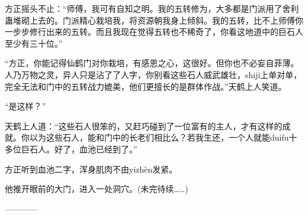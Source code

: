 \begin{this_body}
方正摇头不止：“师傅，我可有自知之明。我的五转修为，大多都是门派用了舍利蛊堆砌上去的。门派精心栽培我，将资源朝我身上倾斜。我的五转，比不上师傅你一步步修行出来的五转。而且我现在觉得五转也不稀奇了，你看这地道中的巨石人至少有三十位。”

“方正，你能记得仙鹤门对你栽培，有感恩之心，这很好。但你也不必妄自菲薄。人乃万物之灵，异人只是沾了了人字，你别看这些石人威武雄壮，shiji上单对单，完全无法和门中的五转战力媲美，他们更擅长的是群体作战。”天鹤上人笑道。

“是这样？”

天鹤上人道：“这些石人很笨的，又赶巧碰到了一位富有的主人，才有这样的成就。你以为这些石人，能和门中的长老们相比么？若我生还，一个人就能duifu十多位巨石人。好了，血池已经到了。”

方正听到血池二字，浑身肌肉不由yizhèn发紧。

他推开眼前的大门，进入一处洞穴。(未完待续……)

------------

\end{this_body}

